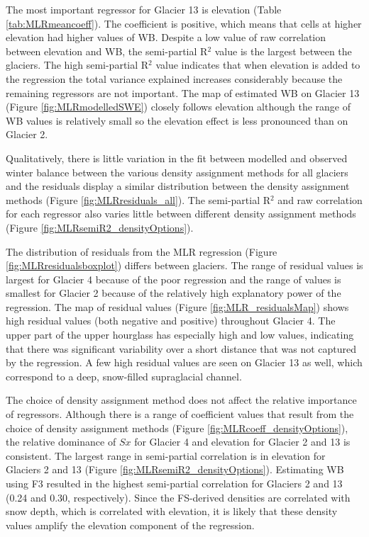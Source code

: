 \documentclass{sfuthesis}
\begin{document}
The most important regressor for Glacier 13 is elevation (Table \ref{tab:MLRmeancoeff}). The coefficient is positive, which means that cells at higher elevation had higher values of WB. Despite a low value of raw correlation between elevation and WB, the semi-partial R$^2$ value is  the largest between the glaciers. The high semi-partial R$^2$ value indicates that when elevation is added to the regression the total variance explained increases considerably because the remaining regressors are not important. The map of estimated WB on Glacier 13 (Figure \ref{fig:MLRmodelledSWE}) closely follows elevation although the range of WB values is relatively small so the elevation effect is less pronounced than on Glacier 2. 

Qualitatively, there is little variation in the fit between modelled and observed winter balance between the various density assignment methods for all glaciers and the residuals display a similar distribution between the density assignment methods (Figure \ref{fig:MLRresiduals_all}). The semi-partial R$^2$ and raw correlation for each regressor also varies little between different density assignment methods (Figure \ref{fig:MLRsemiR2_densityOptions}).

The distribution of residuals from the MLR regression (Figure \ref{fig:MLRresidualsboxplot}) differs between glaciers. The range of residual values is largest for Glacier 4 because of the poor regression and the range of values is smallest for Glacier 2 because of the relatively high explanatory power of the regression. The map of residual values (Figure \ref{fig:MLR_residualsMap}) shows high residual values (both negative and positive) throughout Glacier 4. The upper part of the upper hourglass has especially high and low values, indicating that there was significant variability over a short distance that was not captured by the regression. A few high residual values are seen on Glacier 13 as well, which correspond to a deep, snow-filled supraglacial channel.

The choice of density assignment method does not affect the relative importance of regressors. Although there is a range of coefficient values that result from the choice of density assignment methods (Figure \ref{fig:MLRcoeff_densityOptions}), the relative dominance of $Sx$ for Glacier 4 and elevation for Glacier 2 and 13 is consistent. The largest range in semi-partial correlation is in elevation for Glaciers 2 and 13 (Figure \ref{fig:MLRsemiR2_densityOptions}). Estimating WB using F3 resulted in the highest semi-partial correlation for Glaciers 2 and 13 (0.24 and 0.30, respectively). Since the FS-derived densities are correlated with snow depth, which is correlated with elevation, it is likely that these density values amplify the elevation component of the regression. 
\end{document}
